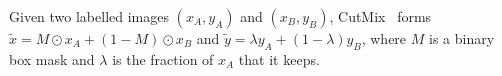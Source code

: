 \begin{definition}[CutMix]\label{S01}
Given two labelled images $(x_A, y_A)$ and $(x_B, y_B)$, CutMix~\cite{R07} forms
$\tilde{x} = M \odot x_A + (1 - M) \odot x_B$ and $\tilde{y} = \lambda y_A + (1 - \lambda) y_B$,
where $M$ is a binary box mask and $\lambda$ is the fraction of $x_A$ that it keeps.
\end{definition}
